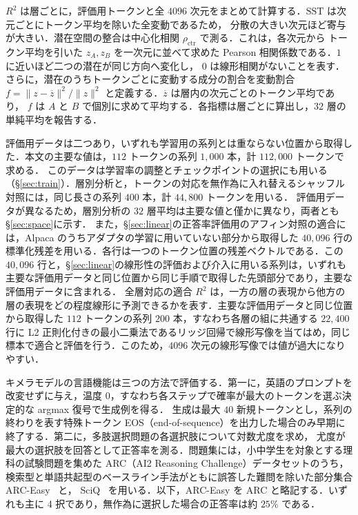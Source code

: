 \documentclass[techrep,noauthor]{ipsj}
\newcommand{\Rsq}{R^2}
\begin{document}
$\Rsq$ は層ごとに，評価用トークンと全 $4096$ 次元をまとめて計算する．$\mathrm{SST}$ は次元ごとにトークン平均を除いた全変動であるため，
分散の大きい次元ほど寄与が大きい．潜在空間の整合は中心化相関 $\rho_{\mathrm{ctr}}$ で測る．これは，各次元から
トークン平均を引いた $z_A,z_B$ を一次元に並べて求めた Pearson 相関係数である．$1$ に近いほど二つの潜在が同じ方向へ変化し，
$0$ は線形相関がないことを表す．さらに，潜在のうちトークンごとに変動する成分の割合を変動割合
$f=\lVert z-\overline z\rVert^2/\lVert z\rVert^2$ と定義する．$\overline z$ は層内の次元ごとのトークン平均であり，
$f$ は $A$ と $B$ で個別に求めて平均する．各指標は層ごとに算出し，$32$ 層の単純平均を報告する．

評価用データは二つあり，いずれも学習用の系列とは重ならない位置から取得した．本文の主要な値は，$112$ トークンの系列 $1{,}000$ 本，計 $112{,}000$ トークンで求める．
このデータは学習率の調整とチェックポイントの選択にも用いる（\S\ref{sec:train}）．層別分析と，トークンの対応を無作為に入れ替えるシャッフル対照には，同じ長さの系列 $400$ 本，計 $44{,}800$ トークンを用いる．
評価用データが異なるため，層別分析の $32$ 層平均は主要な値と僅かに異なり，両者とも\S\ref{sec:space}に示す．
また，\S\ref{sec:linear}の正答率評価用のアフィン対照の適合には，Alpaca のうちアダプタの学習に用いていない部分から取得した $40{,}096$ 行の標準化残差を用いる．各行は一つのトークン位置の残差ベクトルである．この $40{,}096$ 行と，\S\ref{sec:linear}の線形性の評価および介入に用いる系列は，いずれも主要な評価用データと同じ位置から同じ手順で取得した先頭部分であり，主要な評価用データに含まれる．
全層対応の適合 $R^2$ は，一方の層の表現から他方の層の表現をどの程度線形に予測できるかを表す．主要な評価用データと同じ位置から取得した $112$ トークンの系列 $200$ 本，すなわち各層の組に共通する $22{,}400$ 行に L2 正則化付きの最小二乗法であるリッジ回帰で線形写像を当てはめ，同じ標本で適合と評価を行う．このため，$4096$ 次元の線形写像では値が過大になりやすい．

キメラモデルの言語機能は三つの方法で評価する．第一に，英語のプロンプトを改変せずに与え，温度 $0$，すなわち各ステップで確率が最大のトークンを選ぶ決定的な argmax 復号で生成例を得る．
生成は最大 $40$ 新規トークンとし，系列の終わりを表す特殊トークン EOS（end-of-sequence）を出力した場合のみ早期に終了する．第二に，多肢選択問題の各選択肢について対数尤度を求め，
尤度が最大の選択肢を回答として正答率を測る．問題集には，小中学生を対象とする理科の試験問題を集めた ARC（AI2 Reasoning Challenge）データセットのうち，検索型と単語共起型のベースライン手法がともに誤答した難問を除いた部分集合 ARC-Easy~\cite{clark2018thinksolvedquestionanswering} と，
SciQ~\cite{welbl-etal-2017-crowdsourcing} を用いる．以下，ARC-Easy を ARC と略記する．いずれも主に 4 択であり，無作為に選択した場合の正答率は約 $25\%$ である．
\end{document}
